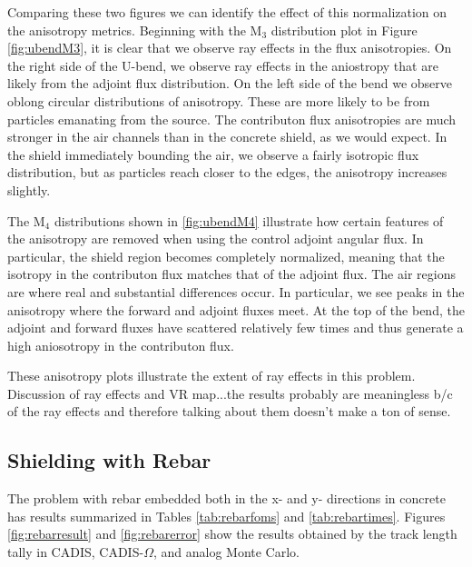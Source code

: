 Comparing these two figures we can identify the effect
of this normalization on the anisotropy metrics. Beginning with the M$_3$
distribution plot in Figure \ref{fig:ubendM3}, it is clear that we observe
ray effects in the flux anisotropies. 
On the right side of the U-bend, we observe ray effects in
the aniostropy that are likely from the adjoint flux distribution. On the left
side of the bend we observe oblong circular distributions of anisotropy. These
are more likely to be from particles emanating from the source. The
contributon flux anisotropies are much stronger in the air channels than in the
concrete shield, as we would expect. In the shield immediately bounding the air,
we observe a fairly isotropic flux distribution, but as particles reach closer
to the edges, the anisotropy increases slightly.

The M$_4$ distributions shown in \ref{fig:ubendM4} illustrate how certain features of
the anisotropy are removed when using the control adjoint angular flux. In
particular, the shield region becomes completely normalized, meaning that the
isotropy in the contributon flux matches that of the adjoint flux. The air
regions are where real and substantial differences occur. In particular, we see
peaks in the anisotropy where the forward and adjoint fluxes meet. At the top of
the bend, the adjoint and forward fluxes have scattered relatively few times and
thus generate a high aniosotropy in the contributon flux.

These anisotropy plots illustrate the extent of ray effects in this problem. 
Discussion of ray effects and VR map...the results probably are meaningless b/c of the ray effects and therefore talking about them doesn't make a ton of sense. 

\subsection{Shielding with Rebar}
\label{subsec:resultrebar}

The problem with rebar embedded both in the x- and y- directions
in concrete has
results summarized in Tables
\ref{tab:rebarfoms} and \ref{tab:rebartimes}. Figures
\ref{fig:rebarresult} and \ref{fig:rebarerror} show the results obtained
by the track length tally in CADIS, CADIS-$\Omega$, and analog
Monte Carlo.

